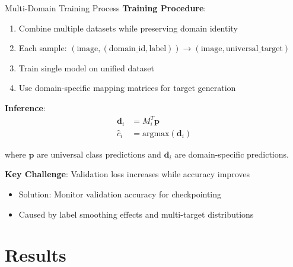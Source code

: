 \documentclass[aspectratio=169]{beamer}
\begin{document}
\begin{frame}{Multi-Domain Training Process}
    \textbf{Training Procedure}:
    \begin{enumerate}
        \item Combine multiple datasets while preserving domain identity
        \item Each sample: $(\text{image}, (\text{domain\_id}, \text{label})) \rightarrow (\text{image}, \text{universal\_target})$
        \item Train single model on unified dataset
        \item Use domain-specific mapping matrices for target generation
    \end{enumerate}

    \vspace{1em}

    \textbf{Inference}:
    \begin{align}
        \mathbf{d}_i & = M_i^T \mathbf{p}            \\
        \hat{c}_i    & = \text{argmax}(\mathbf{d}_i)
    \end{align}

    where $\mathbf{p}$ are universal class predictions and $\mathbf{d}_i$ are domain-specific predictions.

    \vspace{1em}

    \textbf{Key Challenge}: Validation loss increases while accuracy improves
    \begin{itemize}
        \item Solution: Monitor validation accuracy for checkpointing
        \item Caused by label smoothing effects and multi-target distributions
    \end{itemize}
\end{frame}

\section{Results}
\end{document}
